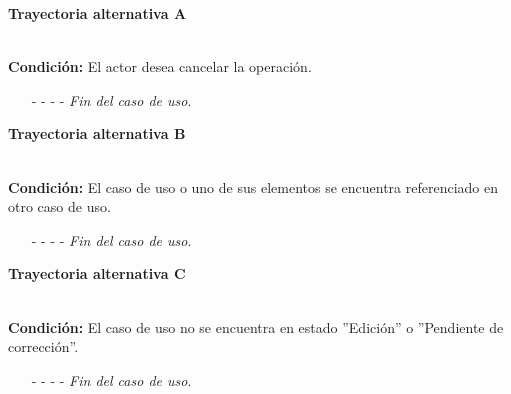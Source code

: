 \hypertarget{CU12-3:TAA}{\textbf{Trayectoria alternativa A}}\\
\noindent \textbf{Condición:} El actor desea cancelar la operación.
\begin{enumerate}
	\UCpaso[\UCactor] Oprime el botón  de la pantalla emergente.
	\UCpaso[\UCsist] Muestra la pantalla .
	\item[- -] - - {\em {Fin del caso de uso}}.%
\end{enumerate}
\hypertarget{CU12-3:TAB}{\textbf{Trayectoria alternativa B}}\\
\noindent \textbf{Condición:} El caso de uso o uno de sus elementos se encuentra referenciado en otro caso de uso.
\begin{enumerate}
	\UCpaso[\UCsist] Muestra el mensaje  en la pantalla  en una pantalla emergente con la lista de casos de uso que están referenciando a los elementos del caso de uso que se desea eliminar.
	\item[- -] - - {\em {Fin del caso de uso}}.
\end{enumerate}
\hypertarget{CU12-3:TAC}{\textbf{Trayectoria alternativa C}}\\
\noindent \textbf{Condición:} El caso de uso no se encuentra en estado ''Edición'' o ''Pendiente de corrección''.
\begin{enumerate}
	\UCpaso[\UCsist] Oculta el botón \eliminar del caso que no se encuentra en estado de ''Edición'' o ''Pendiente de corrección''.
	\item[- -] - - {\em {Fin del caso de uso}}.
\end{enumerate}
